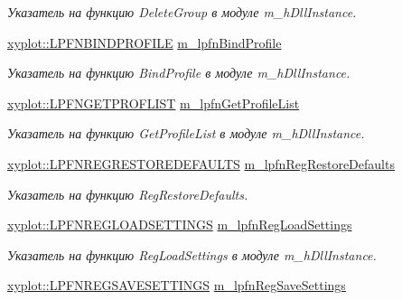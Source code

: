 \begin{DoxyCompactItemize}
\begin{DoxyCompactList}\small\item\em Указатель на функцию Delete\-Group в модуле m\-\_\-h\-Dll\-Instance. \end{DoxyCompactList}\item 
\hyperlink{namespacexyplot_ae721ca071f1b5292073d3e831c8b1150}{xyplot\-::\-L\-P\-F\-N\-B\-I\-N\-D\-P\-R\-O\-F\-I\-L\-E} \hyperlink{group__gr_func_pointers_gaf868f86e6094025ea6e21f6f0ba4140c}{m\-\_\-lpfn\-Bind\-Profile}
\begin{DoxyCompactList}\small\item\em Указатель на функцию Bind\-Profile в модуле m\-\_\-h\-Dll\-Instance. \end{DoxyCompactList}\item 
\hyperlink{namespacexyplot_a6dfacb1414fefdad54092cb9264eb4b1}{xyplot\-::\-L\-P\-F\-N\-G\-E\-T\-P\-R\-O\-F\-L\-I\-S\-T} \hyperlink{group__gr_func_pointers_ga7e30180703300607ed08653d0a7861eb}{m\-\_\-lpfn\-Get\-Profile\-List}
\begin{DoxyCompactList}\small\item\em Указатель на функцию Get\-Profile\-List в модуле m\-\_\-h\-Dll\-Instance. \end{DoxyCompactList}\item 
\hyperlink{namespacexyplot_a4b16720b36f41b782b9c112b406d9698}{xyplot\-::\-L\-P\-F\-N\-R\-E\-G\-R\-E\-S\-T\-O\-R\-E\-D\-E\-F\-A\-U\-L\-T\-S} \hyperlink{group__gr_func_pointers_ga4eb7d852474ae198afe0c1b67b38d63c}{m\-\_\-lpfn\-Reg\-Restore\-Defaults}
\begin{DoxyCompactList}\small\item\em Указатель на функцию Reg\-Restore\-Defaults. \end{DoxyCompactList}\item 
\hyperlink{namespacexyplot_a2f14b7c1bf6f824f039dd8cafcd19f20}{xyplot\-::\-L\-P\-F\-N\-R\-E\-G\-L\-O\-A\-D\-S\-E\-T\-T\-I\-N\-G\-S} \hyperlink{group__gr_func_pointers_gada86eb509b8fb88edc54dd634a198db6}{m\-\_\-lpfn\-Reg\-Load\-Settings}
\begin{DoxyCompactList}\small\item\em Указатель на функцию Reg\-Load\-Settings в модуле m\-\_\-h\-Dll\-Instance. \end{DoxyCompactList}\item 
\hyperlink{namespacexyplot_a852637cd21abfcac7de9635bbd175db7}{xyplot\-::\-L\-P\-F\-N\-R\-E\-G\-S\-A\-V\-E\-S\-E\-T\-T\-I\-N\-G\-S} \hyperlink{group__gr_func_pointers_gacb18df7cd092a71ad121f55d047da5dc}{m\-\_\-lpfn\-Reg\-Save\-Settings}

\end{DoxyCompactItemize}
